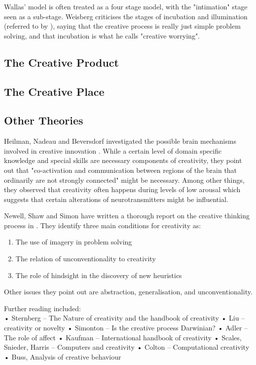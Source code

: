 Wallas' model is often treated as a four stage model, with the "intimation" stage seen as a sub-stage. Weisberg criticises the stages of incubation and illumination (referred to by \citep{Leary1964}), saying that the creative process is really just simple problem solving, and that incubation is what he calls "creative worrying".

\subsection{The Creative Product}

\subsection{The Creative Place}


\subsection{Other Theories}

Heilman, Nadeau and Beversdorf investigated the possible brain mechanisms involved in creative innovation \citep{Heilman2003}. While a certain level of domain specific knowledge and special skills are necessary components of creativity, they point out that "co-activation and communication between regions of the brain that ordinarily are not strongly connected" might be necessary. Among other things, they observed that creativity often happens during levels of low arousal which suggests that certain alterations of neurotransmitters might be influential.

Newell, Shaw and Simon have written a thorough report on the creative thinking process in \citep{Newell1963}. They identify three main conditions for creativity as:

\begin{enumerate}
  \item The use of imagery in problem solving
  \item The relation of unconventionality to creativity
  \item The role of hindsight in the discovery of new heuristics
\end{enumerate}

Other issues they point out are abstraction, generalisation, and unconventionality.

Further reading included:\\
•	Sternberg – The Nature of creativity and the handbook of creativity \citep{Sternberg1988, Sternberg1999}
•	Liu – creativity or novelty \citep{Liu2000}
•	Simonton – Is the creative process Darwinian? \citep{Simonton2011}
•	Adler – The role of affect \citep{Adler2007}
•	Kaufman – International handbook of creativity \citep{Kaufman2006}
•	Scales, Snieder, Harris – Computers and creativity \citep{Scales1999}
•	Colton – Computational creativity \citep{Colton2008}
•	Buss, Analysis of creative behaviour \citep{Buss2011, Zedan2008}



